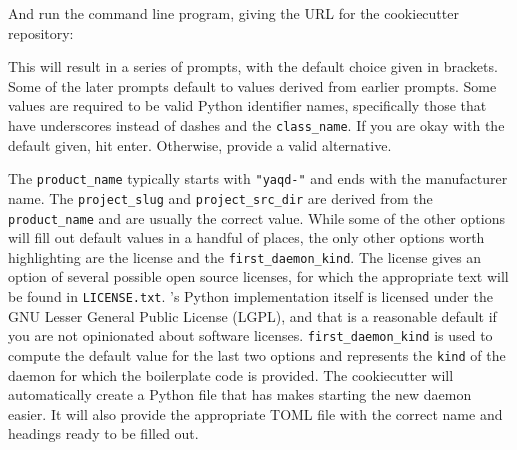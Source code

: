 And run the command line program, giving the URL for the cookiecutter repository:


This will result in a series of prompts, with the default choice given in brackets.
Some of the later prompts default to values derived from earlier prompts.
Some values are required to be valid Python identifier names, specifically those that have underscores instead of dashes and the \texttt{class\_name}.
If you are okay with the default given, hit enter.
Otherwise, provide a valid alternative.

The \texttt{product\_name} typically starts with \texttt{"yaqd-"} and ends with the manufacturer name.
The \texttt{project\_slug} and \texttt{project\_src\_dir} are derived from the \texttt{product\_name} and are usually the correct value.
While some of the other options will fill out default values in a handful of places, the only other options worth highlighting are the license and the \texttt{first\_daemon\_kind}.
The license gives an option of several possible open source licenses, for which the appropriate text will be found in \texttt{LICENSE.txt}.
\yaq{}'s Python implementation itself is licensed under the GNU Lesser General Public License (LGPL), and that is a reasonable default if you are not opinionated about software licenses.
\texttt{first\_daemon\_kind} is used to compute the default value for the last two options and represents the \texttt{kind} of the daemon for which the boilerplate code is provided.
The cookiecutter will automatically create a Python file that has makes starting the new daemon easier.
It will also provide the appropriate TOML file with the correct name and headings ready to be filled out.

